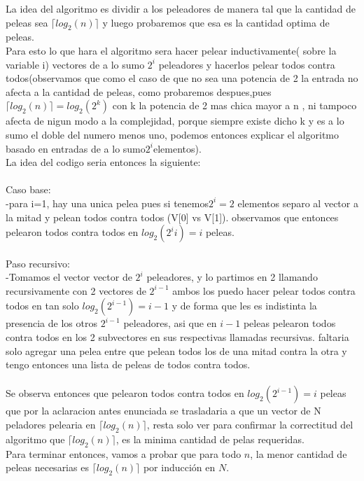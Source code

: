   La idea del algoritmo es dividir a los peleadores de manera tal que la cantidad de peleas sea $\lceil log_{2}(n) \rceil$ y luego probaremos que esa es la cantidad optima de peleas.\\
   Para esto lo que hara el algoritmo sera hacer pelear inductivamente( sobre la variable i) vectores de a lo sumo $2^{i}$ peleadores y hacerlos pelear todos contra todos(observamos que como el caso de que no sea una potencia de 2 la entrada no afecta a la cantidad de peleas, como probaremos despues,pues $\lceil log_{2}(n) \rceil=log_{2}(2^k)$ con k la potencia de 2 mas chica mayor a n , ni tampoco afecta de nigun modo a la complejidad, porque siempre existe dicho k y es  a lo sumo el doble del numero menos uno, podemos entonces  explicar el algoritmo basado en entradas de a lo sumo$2^{i}$elementos).\\
  La idea del codigo seria entonces la siguiente:\\
  \\
Caso base:\\
   -para i=1, hay una unica pelea pues si tenemos$2^{i}=2$ elementos separo al vector a la mitad y pelean todos contra todos (V[0] vs V[1]).
   observamos que entonces pelearon todos contra todos en $log_2(2^{i}i)=i$ peleas.\\
   \\
Paso recursivo:\\
  -Tomamos el vector vector de $2^{i}$ peleadores, y lo partimos en 2 llamando recursivamente con 2 vectores de $2^{i-1}$ ambos los puedo hacer pelear todos contra todos en tan solo $log_2(2^{i-1})=i-1$ y  de forma que les es indistinta la presencia de los otros $2^{i-1}$ peleadores, asi que en $i-1$ peleas pelearon todos contra todos en los 2 subvectores en sus respectivas llamadas recursivas. faltaria solo agregar una pelea entre que pelean todos los de una mitad contra la otra y tengo entonces una lista de peleas de todos contra todos.
\\
\\
Se observa entonces que pelearon todos contra todos en $log_2(2^{i-1})=i$ peleas que por la aclaracion antes enunciada se trasladaria a que un vector de N peladores pelearia en $\lceil log_{2}(n) \rceil$, resta solo ver para confirmar la correctitud del algoritmo que $\lceil log_{2}(n) \rceil$, es la minima cantidad de pelas requeridas.
\\
Para terminar entonces, vamos a probar que para todo $n$, la menor cantidad de peleas necesarias es $\lceil log_{2}(n) \rceil$ por inducción en $N$.

